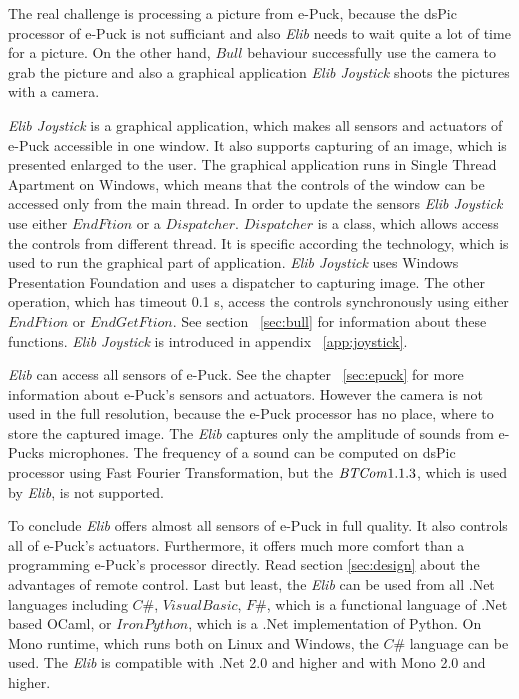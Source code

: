   The real challenge is processing a picture from e-Puck, because the dsPic processor of e-Puck is not sufficiant
  and also {\it Elib} needs to wait quite a lot of time for a picture.
  On the other hand, $Bull$ behaviour successfully use the camera to grab the picture
  and also a graphical application {\it Elib Joystick} shoots the pictures with a camera.

  {\it Elib Joystick} is a graphical application, which makes all sensors and actuators of e-Puck accessible in one window.
  It also supports capturing of an image, which is presented enlarged to the user.
  The graphical application runs in Single Thread Apartment on Windows, which means that the controls of the window can 
  be accessed only from the main thread.
  In order to update the sensors {\it Elib Joystick} use either $EndFtion$ or a $Dispatcher$.
  $Dispatcher$ is a class, which allows access the controls from different thread. It is specific according the technology,
  which is used to run the graphical part of application. {\it Elib Joystick} uses Windows Presentation Foundation and
  uses a dispatcher to capturing image. The other operation, which has timeout 0.1 s, access the controls synchronously using
  either $EndFtion$ or $EndGetFtion$. See section ~\ref{sec:bull} for information about these functions.
  {\it Elib Joystick} is introduced in appendix ~\ref{app:joystick}.

  {\it Elib} can access all sensors of e-Puck. See the chapter ~\ref{sec:epuck} for more information about e-Puck's sensors and actuators.
  However the camera is not used in the full resolution,
  because the e-Puck processor has no place, where to store the captured image.
  The {\it Elib} captures only the amplitude of sounds from e-Pucks microphones. 
  The frequency of a sound can be computed on dsPic processor
  using Fast Fourier Transformation, but the ${\it BTCom} 1.1.3$, which is used by {\it Elib}, is not supported.

  To conclude {\it Elib} offers almost all sensors of e-Puck in full quality. It also controls all of e-Puck's actuators.
  Furthermore, it offers much more comfort than a programming e-Puck's processor directly. 
  Read section \ref{sec:design} about the advantages
  of remote control. 
  Last but least, the {\it Elib} can be used from all .Net languages including $C\#$, $Visual Basic$, $F\#$,
  which is a functional language of .Net based OCaml,
  or $Iron Python$, which is a .Net implementation of Python. On Mono runtime, 
  which runs both on Linux and Windows, the $C\#$ language can be used.
  The {\it Elib} is compatible with .Net 2.0\cite{net} and higher and with Mono\cite{mono} 2.0 and higher.

